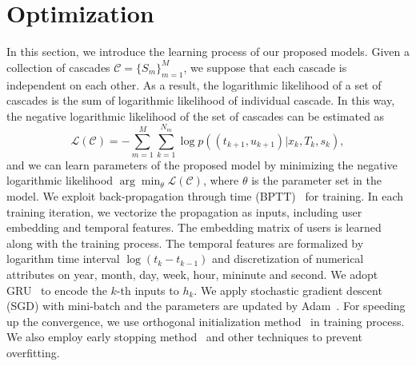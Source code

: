 \section{Optimization}

In this section, we introduce the learning process of our proposed models. 
Given a collection of cascades $\mathcal{C}=\{S_m\}_{m=1}^M$, we suppose that
each cascade is independent on each other. As a result, the logarithmic
likelihood of a set of cascades is the sum of logarithmic likelihood of individual cascade.
In this way, the negative logarithmic likelihood of the set of cascades can be
estimated as
\begin{equation}
\mathcal{L}(\mathcal{C})=-\sum_{m=1}^M \sum_{k=1}^{N_m}
\log p((t_{k+1}, u_{k+1})|x_k, T_k, s_k),
\end{equation}
and we can learn parameters of the proposed model by minimizing the negative
logarithmic likelihood $\arg \min_\theta \mathcal{L}(\mathcal{C})$, where
$\theta$ is the parameter set in the model.
We exploit back-propagation through time
(BPTT)~\cite{chauvin1995backpropagation} for training. In each training
iteration, we vectorize the propagation as inputs, including user embedding and
temporal features. The embedding matrix of
users is learned along with the training process. The temporal features
are formalized by logarithm time interval
$\log(t_k-t_{k-1})$ and discretization of numerical attributes on year, month,
day, week, hour, mininute and second. 
We adopt
GRU~\cite{chung2014empirical} to encode the $k$-th inputs to
$h_k$. 
We apply stochastic gradient descent (SGD) with mini-batch and the parameters
are updated by Adam~\cite{kingma2015method}.
For speeding up the convergence, we use
orthogonal initialization method~\cite{henaff2016orthogonal} in training
process. We also employ early stopping method~\cite{prechelt1998automatic} and
other techniques to prevent overfitting.


